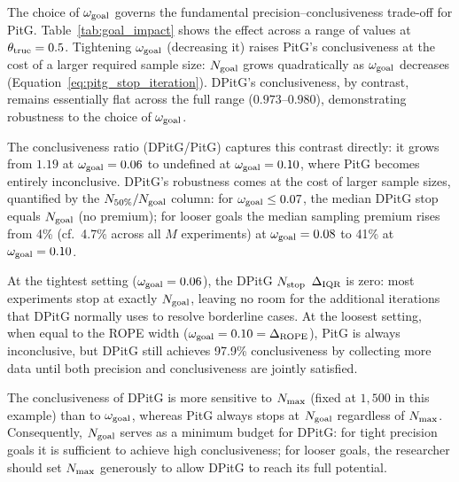 The choice of $\omega_{\rm goal}$ governs the fundamental precision--conclusiveness
trade-off for PitG. Table~\ref{tab:goal_impact} shows the effect across a range of values
at $\theta_{\rm true}=0.5$. Tightening $\omega_{\rm goal}$ (decreasing it) raises PitG's
conclusiveness at the cost of a larger required sample size: $N_{\rm goal}$ grows
quadratically as $\omega_{\rm goal}$ decreases (Equation~\ref{eq:pitg_stop_iteration}).
DPitG's conclusiveness, by contrast, remains essentially flat across the full range
($0.973$--$0.980$), demonstrating robustness to the choice of $\omega_{\rm goal}$.

The conclusiveness ratio (DPitG/PitG) captures this contrast directly: it grows from
$1.19$ at $\omega_{\rm goal}=0.06$ to undefined at $\omega_{\rm goal}=0.10$, where PitG
becomes entirely inconclusive. DPitG's robustness comes at the cost of larger sample
sizes, quantified by the $N_{\rm 50\%}/N_{\rm goal}$ column: for $\omega_{\rm goal} \le 0.07$,
the median DPitG stop equals $N_{\rm goal}$ (no premium); for looser goals the median
sampling premium rises from 4\% (cf.\ 4.7\% across all $M$ experiments) at
$\omega_{\rm goal}=0.08$ to 41\% at $\omega_{\rm goal}=0.10$.

At the tightest setting ($\omega_{\rm goal}=0.06$), the DPitG $N_{\rm stop}$ $\Delta_{\rm IQR}$ is zero:
most experiments stop at exactly $N_{\rm goal}$, leaving no room for the additional
iterations that DPitG normally uses to resolve borderline cases.
At the loosest setting, when equal to the ROPE width ($\omega_{\rm goal}=0.10=\Delta_{\rm ROPE}$), PitG is always
inconclusive, but DPitG still achieves 97.9\% conclusiveness by collecting more data until
both precision and conclusiveness are jointly satisfied.

The conclusiveness of DPitG is more sensitive to $N_{\rm max}$ (fixed at $1{,}500$ in this
example) than to $\omega_{\rm goal}$, whereas PitG always stops at $N_{\rm goal}$ regardless of $N_{\rm max}$.
Consequently, $N_{\rm goal}$ serves as a minimum budget for DPitG: for tight precision goals
it is sufficient to achieve high conclusiveness; for looser goals, the researcher should
set $N_{\rm max}$ generously to allow DPitG to reach its full potential.

